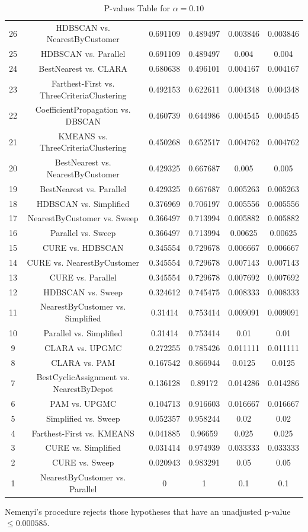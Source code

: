 \documentclass[a4paper,10pt]{article}
\begin{document}
\begin{landscape}
\begin{table}[!htp]
\begin{tabular}{cccccc}
26&HDBSCAN vs. NearestByCustomer&0.691109&0.489497&0.003846&0.003846\\
25&HDBSCAN vs. Parallel&0.691109&0.489497&0.004&0.004\\
24&BestNearest vs. CLARA&0.680638&0.496101&0.004167&0.004167\\
23&Farthest-First vs. ThreeCriteriaClustering&0.492153&0.622611&0.004348&0.004348\\
22&CoefficientPropagation vs. DBSCAN&0.460739&0.644986&0.004545&0.004545\\
21&KMEANS vs. ThreeCriteriaClustering&0.450268&0.652517&0.004762&0.004762\\
20&BestNearest vs. NearestByCustomer&0.429325&0.667687&0.005&0.005\\
19&BestNearest vs. Parallel&0.429325&0.667687&0.005263&0.005263\\
18&HDBSCAN vs. Simplified&0.376969&0.706197&0.005556&0.005556\\
17&NearestByCustomer vs. Sweep&0.366497&0.713994&0.005882&0.005882\\
16&Parallel vs. Sweep&0.366497&0.713994&0.00625&0.00625\\
15&CURE vs. HDBSCAN&0.345554&0.729678&0.006667&0.006667\\
14&CURE vs. NearestByCustomer&0.345554&0.729678&0.007143&0.007143\\
13&CURE vs. Parallel&0.345554&0.729678&0.007692&0.007692\\
12&HDBSCAN vs. Sweep&0.324612&0.745475&0.008333&0.008333\\
11&NearestByCustomer vs. Simplified&0.31414&0.753414&0.009091&0.009091\\
10&Parallel vs. Simplified&0.31414&0.753414&0.01&0.01\\
9&CLARA vs. UPGMC&0.272255&0.785426&0.011111&0.011111\\
8&CLARA vs. PAM&0.167542&0.866944&0.0125&0.0125\\
7&BestCyclicAssignment vs. NearestByDepot&0.136128&0.89172&0.014286&0.014286\\
6&PAM vs. UPGMC&0.104713&0.916603&0.016667&0.016667\\
5&Simplified vs. Sweep&0.052357&0.958244&0.02&0.02\\
4&Farthest-First vs. KMEANS&0.041885&0.96659&0.025&0.025\\
3&CURE vs. Simplified&0.031414&0.974939&0.033333&0.033333\\
2&CURE vs. Sweep&0.020943&0.983291&0.05&0.05\\
1&NearestByCustomer vs. Parallel&0&1&0.1&0.1\\
\hline
\end{tabular}
\caption{P-values Table for $\alpha=0.10$}
\end{table}Nemenyi's procedure rejects those hypotheses that have an unadjusted p-value $\le0.000585$.


\end{landscape}
\end{document}

